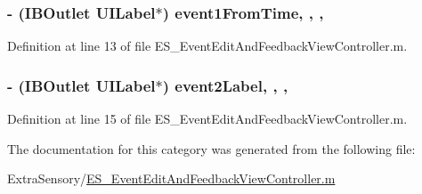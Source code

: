\hypertarget{category_e_s___event_edit_and_feedback_view_controller_07_08_a99e9a66ccd6387758f50c9721622d41d}{
\subsubsection[{event1\+From\+Time}]{\setlength{\rightskip}{0pt plus 5cm}-\/ (I\+B\+Outlet U\+I\+Label$\ast$) event1\+From\+Time\hspace{0.3cm}{\ttfamily [read]}, {\ttfamily [write]}, {\ttfamily [nonatomic]}, {\ttfamily [weak]}}}\label{category_e_s___event_edit_and_feedback_view_controller_07_08_a99e9a66ccd6387758f50c9721622d41d}


Definition at line 13 of file E\+S\+\_\+\+Event\+Edit\+And\+Feedback\+View\+Controller.\+m.

\hypertarget{category_e_s___event_edit_and_feedback_view_controller_07_08_ab1561af5dcc45be515718d87bc57af2d}{
\subsubsection[{event2\+Label}]{\setlength{\rightskip}{0pt plus 5cm}-\/ (I\+B\+Outlet U\+I\+Label$\ast$) event2\+Label\hspace{0.3cm}{\ttfamily [read]}, {\ttfamily [write]}, {\ttfamily [nonatomic]}, {\ttfamily [weak]}}}\label{category_e_s___event_edit_and_feedback_view_controller_07_08_ab1561af5dcc45be515718d87bc57af2d}


Definition at line 15 of file E\+S\+\_\+\+Event\+Edit\+And\+Feedback\+View\+Controller.\+m.



The documentation for this category was generated from the following file\+:\begin{DoxyCompactItemize}
\item 
Extra\+Sensory/\hyperlink{_e_s___event_edit_and_feedback_view_controller_8m}{E\+S\+\_\+\+Event\+Edit\+And\+Feedback\+View\+Controller.\+m}\end{DoxyCompactItemize}
